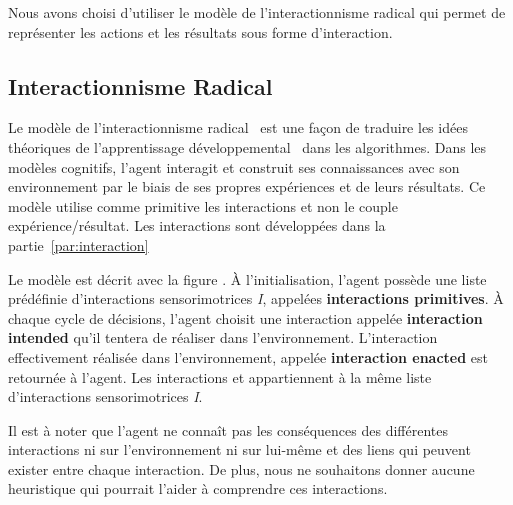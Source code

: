 \documentclass{llncs}
\begin{document}
Nous avons choisi d'utiliser le modèle de l'interactionnisme radical qui permet de représenter les actions et les résultats sous forme d'interaction. 



\subsection{Interactionnisme Radical}
Le modèle de l'interactionnisme radical~\cite{Liris-6480-radical-interactionism} 
est une façon de traduire les idées théoriques de l'apprentissage développemental~\cite{cognitiviste-piaget1959construction,cognitiviste-webster2013mammalian,cognitiviste-o2011red} dans les algorithmes. Dans les modèles cognitifs, l'agent interagit et construit ses connaissances avec son environnement par le biais de ses propres expériences et de leurs résultats. Ce modèle utilise comme primitive les interactions et non le couple expérience/résultat. Les interactions sont développées dans la partie~\ref{par:interaction}

Le modèle est décrit avec la figure .
À l'initialisation, l'agent possède une liste prédéfinie d'interactions sensorimotrices \emph{I}, appelées \textbf{interactions primitives}. À chaque cycle de décisions, l'agent choisit une interaction appelée \textbf{interaction intended} qu'il tentera de réaliser dans l'environnement. L'interaction effectivement réalisée dans l'environnement, appelée \textbf{interaction enacted} est retournée à l'agent. Les interactions \intended et \enacted appartiennent à la même liste d'interactions sensorimotrices \emph{I}. 

Il est à noter que l'agent ne connaît pas les conséquences des différentes interactions ni sur l'environnement ni sur lui-même et des liens qui peuvent exister entre chaque interaction. De plus, nous ne souhaitons donner aucune heuristique qui pourrait l'aider à comprendre ces interactions.
\end{document}
